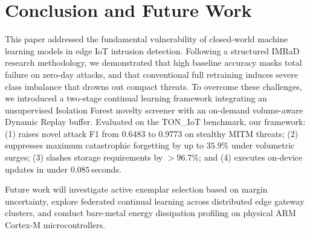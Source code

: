 \documentclass[conference]{IEEEtran}
\begin{document}
\section{Conclusion and Future Work}
\label{sec:conclusion_and_future_work}

This paper addressed the fundamental vulnerability of closed-world machine learning models in edge IoT intrusion detection. Following a structured IMRaD research methodology, we demonstrated that high baseline accuracy masks total failure on zero-day attacks, and that conventional full retraining induces severe class imbalance that drowns out compact threats. To overcome these challenges, we introduced a two-stage continual learning framework integrating an unsupervised Isolation Forest novelty screener with an on-demand volume-aware Dynamic Replay buffer. Evaluated on the TON\_IoT benchmark, our framework: (1) raises novel attack F1 from 0.6483 to 0.9773 on stealthy MITM threats; (2) suppresses maximum catastrophic forgetting by up to $35.9\%$ under volumetric surges; (3) slashes storage requirements by $>96.7\%$; and (4) executes on-device updates in under $0.085$\,seconds.

Future work will investigate active exemplar selection based on margin uncertainty, explore federated continual learning across distributed edge gateway clusters, and conduct bare-metal energy dissipation profiling on physical ARM Cortex-M microcontrollers.
\end{document}
